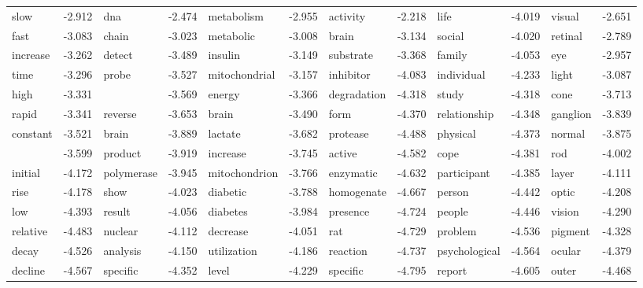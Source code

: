 \documentclass{article}
\begin{document}
\begin{table}
{\begin{tabular}{|l r|l r|l r|l r|l r|l r|}
slow & -2.912 & dna & -2.474 & metabolism & -2.955 & activity & -2.218 & life & -4.019 & visual & -2.651\\
fast & -3.083 & chain & -3.023 & metabolic & -3.008 & brain & -3.134 & social & -4.020 & retinal & -2.789\\
increase & -3.262 & detect & -3.489 & insulin & -3.149 & substrate & -3.368 & family & -4.053 & eye & -2.957\\
time & -3.296 & probe & -3.527 & mitochondrial & -3.157 & inhibitor & -4.083 & individual & -4.233 & light & -3.087\\
high & -3.331 &  & -3.569 & energy & -3.366 & degradation & -4.318 & study & -4.318 & cone & -3.713\\
rapid & -3.341 & reverse & -3.653 & brain & -3.490 & form & -4.370 & relationship & -4.348 & ganglion & -3.839\\
constant & -3.521 & brain & -3.889 & lactate & -3.682 & protease & -4.488 & physical & -4.373 & normal & -3.875\\
 & -3.599 & product & -3.919 & increase & -3.745 & active & -4.582 & cope & -4.381 & rod & -4.002\\
initial & -4.172 & polymerase & -3.945 & mitochondrion & -3.766 & enzymatic & -4.632 & participant & -4.385 & layer & -4.111\\
rise & -4.178 & show & -4.023 & diabetic & -3.788 & homogenate & -4.667 & person & -4.442 & optic & -4.208\\
low & -4.393 & result & -4.056 & diabetes & -3.984 & presence & -4.724 & people & -4.446 & vision & -4.290\\
relative & -4.483 & nuclear & -4.112 & decrease & -4.051 & rat & -4.729 & problem & -4.536 & pigment & -4.328\\
decay & -4.526 & analysis & -4.150 & utilization & -4.186 & reaction & -4.737 & psychological & -4.564 & ocular & -4.379\\
decline & -4.567 & specific & -4.352 & level & -4.229 & specific & -4.795 & report & -4.605 & outer & -4.468\\
\hline
\end{tabular}
}
\end{table}
\end{document}
